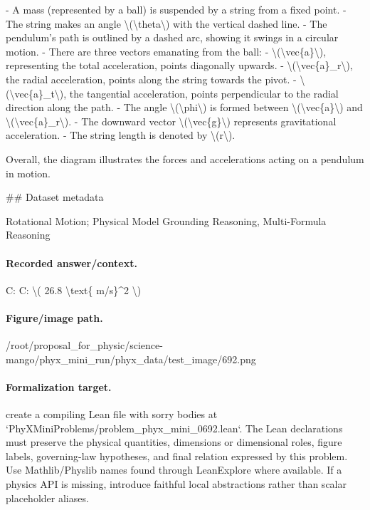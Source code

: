- A mass (represented by a ball) is suspended by a string from a fixed point.
- The string makes an angle \textbackslash{}(\textbackslash{}theta\textbackslash{}) with the vertical dashed line.
- The pendulum's path is outlined by a dashed arc, showing it swings in a circular motion.
- There are three vectors emanating from the ball:
  - \textbackslash{}(\textbackslash{}vec\{a\}\textbackslash{}), representing the total acceleration, points diagonally upwards.
  - \textbackslash{}(\textbackslash{}vec\{a\}\_r\textbackslash{}), the radial acceleration, points along the string towards the pivot.
  - \textbackslash{}(\textbackslash{}vec\{a\}\_t\textbackslash{}), the tangential acceleration, points perpendicular to the radial direction along the path.
- The angle \textbackslash{}(\textbackslash{}phi\textbackslash{}) is formed between \textbackslash{}(\textbackslash{}vec\{a\}\textbackslash{}) and \textbackslash{}(\textbackslash{}vec\{a\}\_r\textbackslash{}).
- The downward vector \textbackslash{}(\textbackslash{}vec\{g\}\textbackslash{}) represents gravitational acceleration.
- The string length is denoted by \textbackslash{}(r\textbackslash{}).

Overall, the diagram illustrates the forces and accelerations acting on a pendulum in motion.

\#\# Dataset metadata

Rotational Motion; Physical Model Grounding Reasoning, Multi-Formula Reasoning

\paragraph{Recorded answer/context.}
C: C: \textbackslash{}( 26.8 \textbackslash{}text\{ m/s\}\textasciicircum{}2 \textbackslash{})

\paragraph{Figure/image path.}
/root/proposal\_for\_physic/science-mango/phyx\_mini\_run/phyx\_data/test\_image/692.png

\paragraph{Formalization target.}
create a compiling Lean file with sorry bodies at `PhyXMiniProblems/problem\_phyx\_mini\_0692.lean`. The Lean declarations must preserve the physical quantities, dimensions or dimensional roles, figure labels, governing-law hypotheses, and final relation expressed by this problem.
Use Mathlib/Physlib names found through LeanExplore where available. If a physics API is missing, introduce faithful local abstractions rather than scalar placeholder aliases.

